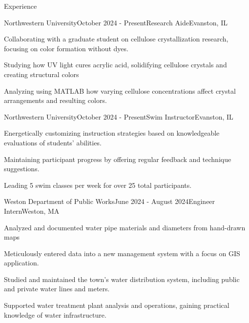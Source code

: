 \documentclass[
	a4paper, %
	10pt, %
]{resume} %
\begin{document}
\begin{rSection}{Experience}

	\begin{rSubsection}{Northwestern University}{October 2024 - Present}{Research Aide}{Evanston, IL}
		\item Collaborating with a graduate student on cellulose crystallization research, focusing on color formation without dyes.
		\item Studying how UV light cures acrylic acid, solidifying cellulose crystals and creating structural colors
		\item Analyzing using MATLAB how varying cellulose concentrations affect crystal arrangements and resulting colors.
	\end{rSubsection}


	\begin{rSubsection}{Northwestern University}{October 2024 - Present}{Swim Instructor}{Evanston, IL}
		\item Energetically customizing instruction strategies based on knowledgeable evaluations of students' abilities.
		\item Maintaining participant progress by offering regular feedback and technique suggestions.
		\item Leading 5 swim classes per week for over 25 total participants.
	\end{rSubsection}


	\begin{rSubsection}{Weston Department of Public Works}{June 2024 - August 2024}{Engineer Intern}{Weston, MA}
		\item Analyzed and documented water pipe materials and diameters from hand-drawn maps
		\item Meticulously entered data into a new management system with a focus on GIS application.
		\item Studied and maintained the town’s water distribution system, including public and private water lines and meters.
		\item Supported water treatment plant analysis and operations, gaining practical knowledge of water infrastructure.
	\end{rSubsection}

\end{rSection}

\end{document}
